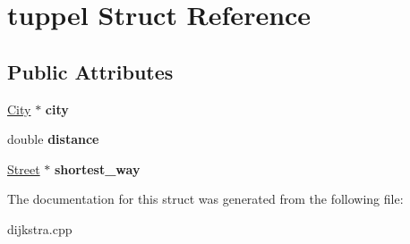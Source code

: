 \hypertarget{structtuppel}{}\section{tuppel Struct Reference}
\label{structtuppel}
\subsection*{Public Attributes}
\begin{DoxyCompactItemize}
\item 
\mbox{\label{structtuppel_aea3598cf38827a307797d8e8ac5549ac}} 
\hyperlink{class_city}{City} $\ast$ {\bfseries city}
\item 
\mbox{\label{structtuppel_a65aa71a1a6b8b896813dfab8222a5b32}} 
double {\bfseries distance}
\item 
\mbox{\label{structtuppel_a3cf2fc709ffea8ce66a5dea627365b83}} 
\hyperlink{class_street}{Street} $\ast$ {\bfseries shortest\+\_\+way}
\end{DoxyCompactItemize}


The documentation for this struct was generated from the following file\+:\begin{DoxyCompactItemize}
\item 
dijkstra.\+cpp\end{DoxyCompactItemize}

